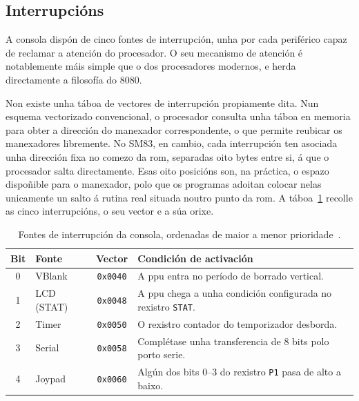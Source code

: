 \subsection{Interrupcións}
\label{subsec:interrupcions}

A consola dispón de cinco fontes de interrupción, unha por cada periférico
capaz de reclamar a atención do procesador.
O seu mecanismo de atención é notablemente máis simple que o dos procesadores modernos,
e herda directamente a filosofía do 8080.

Non existe unha táboa de vectores de interrupción propiamente dita.
Nun esquema vectorizado convencional, o procesador consulta unha táboa en memoria
para obter a dirección do manexador correspondente, o que permite reubicar
os manexadores libremente. No SM83, en cambio, cada interrupción ten asociada
unha dirección fixa no comezo da \acrshort{rom}, separadas oito bytes entre si,
á que o procesador salta directamente.
Esas oito posicións son, na práctica, o espazo dispoñible para o manexador,
polo que os programas adoitan colocar nelas unicamente un salto
á rutina real situada noutro punto da \acrshort{rom}.
A táboa~\ref{tab:interrupcions} recolle as cinco interrupcións, o seu vector e a súa orixe.

\begin{table}[htbp]
  \centering
  \begin{tabular}{c|l|c|p{5cm}}
  \rowcolor{udcpink!25}
  \textbf{Bit} & \textbf{Fonte} & \textbf{Vector} & \textbf{Condición de activación} \\\hline
  0 & VBlank      & \texttt{0x0040} & A \acrshort{ppu} entra no período de borrado vertical. \\
  1 & LCD (STAT)  & \texttt{0x0048} & A \acrshort{ppu} chega a unha condición configurada no rexistro \texttt{STAT}. \\
  2 & Timer       & \texttt{0x0050} & O rexistro contador do temporizador desborda. \\
  3 & Serial      & \texttt{0x0058} & Complétase unha transferencia de 8 bits polo porto serie. \\
  4 & Joypad      & \texttt{0x0060} & Algún dos bits 0--3 do rexistro \texttt{P1} pasa de alto a baixo. \\
  \end{tabular}
  \caption{Fontes de interrupción da consola, ordenadas de maior a menor prioridade~\cite{pandocs}.}
  \label{tab:interrupcions}
\end{table}

